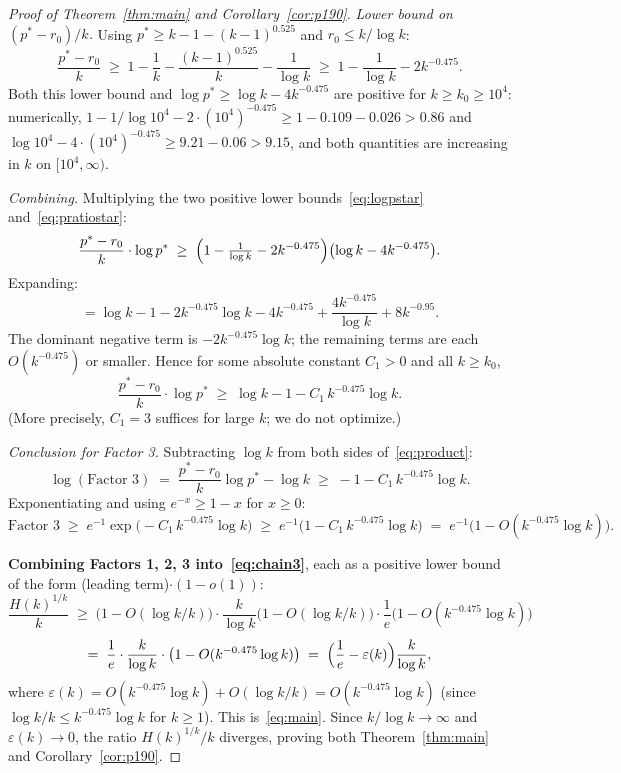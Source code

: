 \documentclass[11pt,reqno,a4paper]{amsart}
\theoremstyle{plain}
\theoremstyle{definition}
\theoremstyle{remark}
\numberwithin{equation}{section}
\begin{document}
\begin{proof}[Proof of Theorem~\ref{thm:main} and Corollary~\ref{cor:p190}]
\emph{Lower bound on $(p^{*}-r_{0})/k$.} Using
$p^{*}\ge k-1-(k-1)^{0.525}$ and $r_{0}\le k/\log k$:
\begin{equation}
\frac{p^{*}-r_{0}}{k}
\;\ge\;1-\frac{1}{k}-\frac{(k-1)^{0.525}}{k}-\frac{1}{\log k}
\;\ge\;1-\frac{1}{\log k}-2k^{-0.475}.
\label{eq:pratiostar}
\end{equation}
Both this lower bound and $\log p^{*}\ge\log k-4k^{-0.475}$ are
positive for $k\ge k_{0}\ge 10^{4}$: numerically,
$1-1/\log 10^{4}-2\cdot(10^{4})^{-0.475}\ge 1-0.109-0.026>0.86$ and
$\log 10^{4}-4\cdot(10^{4})^{-0.475}\ge 9.21-0.06>9.15$, and both
quantities are increasing in $k$ on $[10^{4},\infty)$.

\emph{Combining.} Multiplying the two positive lower
bounds~\eqref{eq:logpstar} and~\eqref{eq:pratiostar}:
\[
\frac{p^{*}-r_{0}}{k}\cdot\log p^{*}
\;\ge\;\Bigl(1-\tfrac{1}{\log k}-2k^{-0.475}\Bigr)\bigl(\log k-4k^{-0.475}\bigr).
\]
Expanding:
\[
=\log k-1-2k^{-0.475}\log k-4k^{-0.475}+\frac{4k^{-0.475}}{\log k}+8k^{-0.95}.
\]
The dominant negative term is $-2k^{-0.475}\log k$; the remaining
terms are each $O(k^{-0.475})$ or smaller. Hence for some absolute
constant $C_{1}>0$ and all $k\ge k_{0}$,
\begin{equation}
\frac{p^{*}-r_{0}}{k}\cdot\log p^{*}\;\ge\;\log k-1-C_{1}\,k^{-0.475}\log k.
\label{eq:product}
\end{equation}
(More precisely, $C_{1}=3$ suffices for large $k$; we do not optimize.)

\emph{Conclusion for Factor 3.} Subtracting $\log k$ from both sides
of~\eqref{eq:product}:
\[
\log(\text{Factor 3})\;=\;\frac{p^{*}-r_{0}}{k}\log p^{*}-\log k
\;\ge\;-1-C_{1}\,k^{-0.475}\log k.
\]
Exponentiating and using $e^{-x}\ge 1-x$ for $x\ge 0$:
\[
\text{Factor 3}\;\ge\;e^{-1}\exp\!\bigl(-C_{1}\,k^{-0.475}\log k\bigr)
\;\ge\;e^{-1}\bigl(1-C_{1}\,k^{-0.475}\log k\bigr)
\;=\;e^{-1}\bigl(1-O(k^{-0.475}\log k)\bigr).
\]

\smallskip
\noindent\textbf{Combining Factors 1, 2, 3 into~\eqref{eq:chain3}},
each as a positive lower bound of the form (leading term)$\cdot(1-o(1))$:
\[
\frac{H(k)^{1/k}}{k}
\;\ge\;\bigl(1-O(\log k/k)\bigr)\cdot\frac{k}{\log k}\bigl(1-O(\log k/k)\bigr)
\cdot\frac{1}{e}\bigl(1-O(k^{-0.475}\log k)\bigr)
\]
\[
=\;\frac{1}{e}\cdot\frac{k}{\log k}\cdot\bigl(1-O(k^{-0.475}\log k)\bigr)
\;=\;\Bigl(\frac{1}{e}-\varepsilon(k)\Bigr)\frac{k}{\log k},
\]
where
$\varepsilon(k)=O(k^{-0.475}\log k)+O(\log k/k)=O(k^{-0.475}\log k)$
(since $\log k/k\le k^{-0.475}\log k$ for $k\ge 1$). This
is~\eqref{eq:main}. Since $k/\log k\to\infty$ and
$\varepsilon(k)\to 0$, the ratio $H(k)^{1/k}/k$ diverges, proving
both Theorem~\ref{thm:main} and Corollary~\ref{cor:p190}.
\end{proof}
\end{document}
